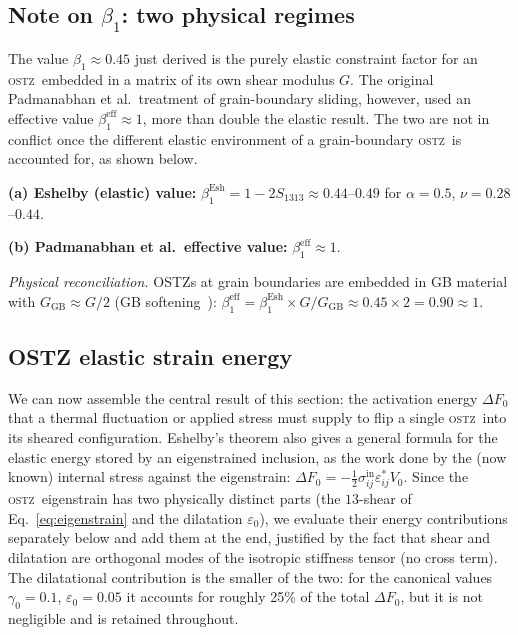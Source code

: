 \documentclass[5p,sort&compress]{elsarticle}
\newcommand{\OSTZ}{\textsc{ostz}}
\newcommand{\dF}{\Delta F_0}
\newcommand{\gz}{\gamma_0}
\newcommand{\half}{\tfrac{1}{2}}
\begin{document}
\subsection{Note on $\beta_1$: two physical regimes}

The value $\beta_1\approx0.45$ just derived is the purely elastic
constraint factor for an \OSTZ\ embedded in a matrix of its own
shear modulus $G$. The original Padmanabhan et al.\ treatment of
grain-boundary sliding, however, used an effective value
$\beta_1^\text{eff}\approx1$, more than double the elastic result.
The two are not in conflict once the different elastic environment
of a grain-boundary \OSTZ\ is accounted for, as shown below.

\textbf{(a) Eshelby (elastic) value:}
$\beta_1^\text{Esh}=1-2S_{1313}\approx0.44$--$0.49$
for $\alpha=0.5$, $\nu=0.28$--$0.44$.

\textbf{(b) Padmanabhan et al.\ effective value:} $\beta_1^\text{eff}\approx1$.

\textit{Physical reconciliation.} OSTZs at grain boundaries are embedded
in GB material with $G_\text{GB}\approx G/2$ (GB softening~\cite{wolf1990}):
$\beta_1^\text{eff}=\beta_1^\text{Esh}\times G/G_\text{GB}
\approx0.45\times2=0.90\approx1$.

\subsection{OSTZ elastic strain energy}
\label{sec:energy}

We can now assemble the central result of this section: the
activation energy $\dF$ that a thermal fluctuation or applied stress
must supply to flip a single \OSTZ\ into its sheared configuration.
Eshelby's theorem also gives a general formula for the elastic
energy stored by an eigenstrained inclusion, as the work done by the
(now known) internal stress against the eigenstrain:
$\dF=-\half\sigma_{ij}^\mathrm{in}\varepsilon^*_{ij}V_0$. Since the
\OSTZ\ eigenstrain has two physically distinct parts (the
$13$-shear of Eq.~\eqref{eq:eigenstrain} and the dilatation
$\varepsilon_0$), we evaluate their energy contributions
separately below and add them at the end, justified by the fact
that shear and dilatation are orthogonal modes of the isotropic
stiffness tensor (no cross term). The dilatational contribution is
the smaller of the two: for the canonical values $\gz=0.1$,
$\varepsilon_0=0.05$ it accounts for roughly 25\% of the total
$\dF$, but it is not negligible and is retained throughout.
\end{document}
